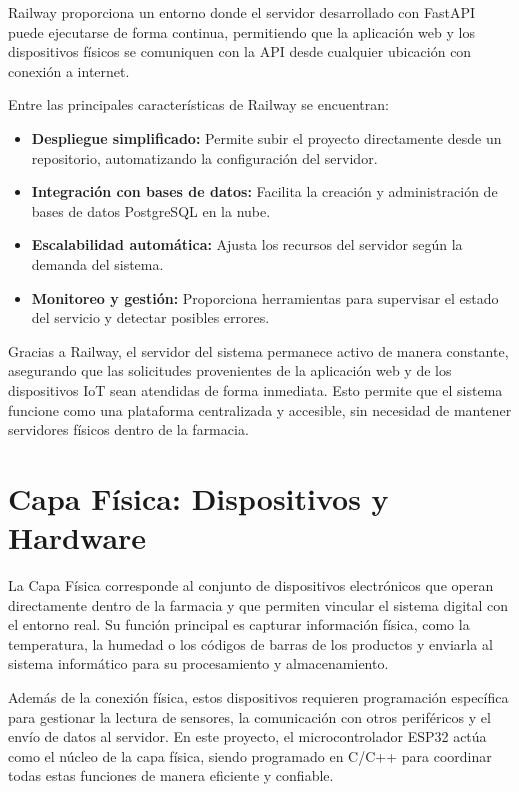 Railway proporciona un entorno donde el servidor desarrollado con FastAPI puede ejecutarse de forma continua, permitiendo que la aplicación web y los dispositivos físicos se comuniquen con la API desde cualquier ubicación con conexión a internet.

Entre las principales características de Railway se encuentran:

\begin{itemize}
    \item \textbf{Despliegue simplificado:} Permite subir el proyecto directamente desde un repositorio, automatizando la configuración del servidor.
    \item \textbf{Integración con bases de datos:} Facilita la creación y administración de bases de datos PostgreSQL en la nube.
    \item \textbf{Escalabilidad automática:} Ajusta los recursos del servidor según la demanda del sistema.
    \item \textbf{Monitoreo y gestión:} Proporciona herramientas para supervisar el estado del servicio y detectar posibles errores.
\end{itemize}

Gracias a Railway, el servidor del sistema permanece activo de manera constante, asegurando que las solicitudes provenientes de la aplicación web y de los dispositivos IoT sean atendidas de forma inmediata. Esto permite que el sistema funcione como una plataforma centralizada y accesible, sin necesidad de mantener servidores físicos dentro de la farmacia.
















\section{Capa Física: Dispositivos y Hardware}

La Capa Física corresponde al conjunto de dispositivos electrónicos que operan directamente dentro de la farmacia y que permiten vincular el sistema digital con el entorno real. Su función principal es capturar información física, como la temperatura, la humedad o los códigos de barras de los productos y enviarla al sistema informático para su procesamiento y almacenamiento.

Además de la conexión física, estos dispositivos requieren programación específica para gestionar la lectura de sensores, la comunicación con otros periféricos y el envío de datos al servidor. En este proyecto, el microcontrolador ESP32 actúa como el núcleo de la capa física, siendo programado en C/C++ para coordinar todas estas funciones de manera eficiente y confiable.

